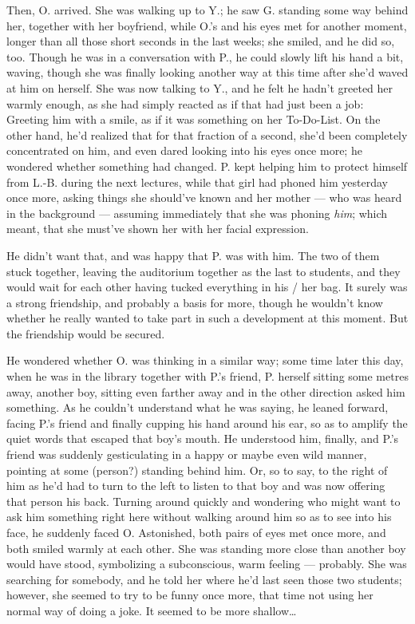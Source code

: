 Then, O. arrived. 
She was walking up to Y.; he saw G. standing some way behind her, together with her boyfriend, while O.'s and his eyes met for another moment, longer than all those short seconds in the last weeks; she smiled, and he did so, too. Though he was in a conversation with P., he could slowly lift his hand a bit, waving, though she was finally looking another way at this time after she'd waved at him on herself. She was now talking to Y., and he felt he hadn't greeted her warmly enough, as she had simply reacted as if that had just been a job: Greeting him with a smile, as if it was something on her To-Do-List. On the other hand, he'd realized that for that fraction of a second, she'd been completely concentrated on him, and even dared looking into his eyes once more; he wondered whether something had changed. P. kept helping him to protect himself from L.-B. during the next lectures, while that girl had phoned him yesterday once more, asking things she should've known and her mother --- who was heard in the background --- assuming immediately that she was phoning \emph{him}; which meant, that she must've shown her with her facial expression.

He didn't want that, and was happy that P. was with him. The two of them stuck together, leaving the auditorium together as the last to students, and they would wait for each other having tucked everything in his / her bag. It surely was a strong friendship, and probably a basis for more, though he wouldn't know whether he really wanted to take part in such a development at this moment. But the friendship would be secured.

He wondered whether O. was thinking in a similar way; some time later this day, when he was in the library together with P.'s friend, P. herself sitting some metres away, another boy, sitting even farther away and in the other direction asked him something. As he couldn't understand what he was saying, he leaned forward, facing P.'s friend and finally cupping his hand around his ear, so as to amplify the quiet words that escaped that boy's mouth. He understood him, finally, and P.'s friend was suddenly gesticulating in a happy or maybe even wild manner, pointing at some (person?) standing behind him. Or, so to say, to the right of him as he'd had to turn to the left to listen to that boy and was now offering that person his back. Turning around quickly and wondering who might want to ask him something right here without walking around him so as to see into his face, he suddenly faced O. Astonished, both pairs of eyes met once more, and both smiled warmly at each other. She was standing more close than another boy would have stood, symbolizing a subconscious, warm feeling --- probably. She was searching for somebody, and he told her where he'd last seen those two students; however, she seemed to try to be funny once more, that time not using her normal way of doing a joke. It seemed to be more shallow\ldots

